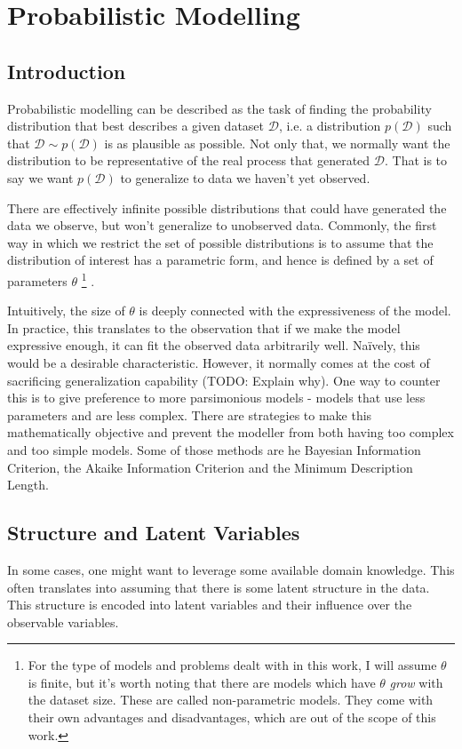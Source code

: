 \chapter{Probabilistic Modelling}
\label{chapter:probmodel}

\section{Introduction}
\label{section:probmodelintro}
Probabilistic modelling can be described as the task of finding the probability
distribution that best describes a given dataset $\mathcal{D}$, i.e. a
distribution $p(\mathcal{D})$ such that $\mathcal{D} \sim p(\mathcal{D})$
is as plausible as possible. Not only that, we normally want the distribution
to be representative of the real process that generated $\mathcal{D}$. That is
to say we want $p(\mathcal{D})$ to generalize to data we haven't yet observed.

There are effectively infinite possible distributions that could have
generated the data we observe, but won't generalize to unobserved data.
Commonly, the first way in which we restrict the set of possible distributions is
to assume that the distribution of interest has a parametric form, and hence is
defined by a set of parameters $\theta$ \footnote{For the type of models and problems
dealt with in this work, I will assume $\theta$ is finite, but it's worth noting
that there are models which have $\theta$ \emph{grow} with the dataset size.
These are called non-parametric models. They come with their own advantages and
disadvantages, which are out of the scope of this work.} .

Intuitively, the size of $\theta$ is deeply connected with the expressiveness
of the model. In practice, this translates to the observation that if we make
the model expressive enough, it can fit the observed data arbitrarily well. Naïvely,
this would be a desirable characteristic. However, it normally comes at the cost
of sacrificing generalization capability (TODO: Explain why). One way to counter
this is to give preference to more parsimonious models - models that use less
parameters and are less complex. There are strategies to make this mathematically
objective and prevent the modeller from both having too complex and too simple
models. Some of those methods are he Bayesian Information Criterion, the Akaike
Information Criterion and the Minimum Description Length.

\section{Structure and Latent Variables}
\label{section:probmodellatvar}
In some cases, one might want to leverage some available domain knowledge. This
often translates into assuming that there is some latent structure in the data.
This structure is encoded into latent variables and their influence over the
observable variables.

